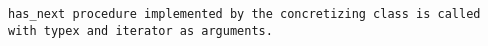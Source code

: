 
\tt{has_next} procedure implemented by the concretizing class
is called with \tt{typex} and \tt{iterator} as arguments.
